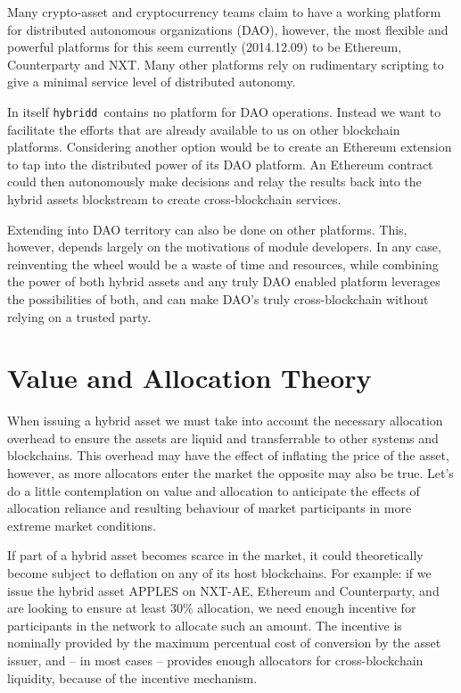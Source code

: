 \documentclass[11pt, a4paper]{article}
\newcommand{\hybridd}{\texttt{hybridd}\, }
\begin{document}
Many crypto-asset and cryptocurrency teams claim to have a working platform for distributed autonomous organizations (DAO), however, the most flexible and powerful platforms for this seem currently (2014.12.09) to be Ethereum, Counterparty and NXT. Many other platforms rely on rudimentary scripting to give a minimal service level of distributed autonomy.

In itself \hybridd contains no platform for DAO operations. Instead we want to facilitate the efforts that are already available to us on other blockchain platforms. Considering another option would be to create an Ethereum extension to tap into the distributed power of its DAO platform. An Ethereum contract could then autonomously make decisions and relay the results back into the hybrid assets blockstream to create cross-blockchain services.

Extending into DAO territory can also be done on other platforms. This, however, depends largely on the motivations of module developers. In any case, reinventing the wheel would be a waste of time and resources, while combining the power of both hybrid assets and any truly DAO enabled platform leverages the possibilities of both, and can make DAO's truly cross-blockchain without relying on a trusted party.


\section{Value and Allocation Theory}

When issuing a hybrid asset we must take into account the necessary allocation overhead to ensure the assets are liquid and transferrable to other systems and blockchains. This overhead may have the effect of inflating the price of the asset, however, as more allocators enter the market the opposite may also be true. Let's do a little contemplation on value and allocation to anticipate the effects of allocation reliance and resulting behaviour of market participants in more extreme market conditions.

If part of a hybrid asset becomes scarce in the market, it could theoretically become subject to deflation on any of its host blockchains. For example: if we issue the hybrid asset APPLES on NXT-AE, Ethereum and Counterparty\cite{counterparty}, and are looking to ensure at least $30\%$ allocation, we need enough incentive for participants in the network to allocate such an amount. The incentive is nominally provided by the maximum percentual cost of conversion by the asset issuer, and – in most cases – provides enough allocators for cross-blockchain liquidity, because of the incentive mechanism.
\end{document}
